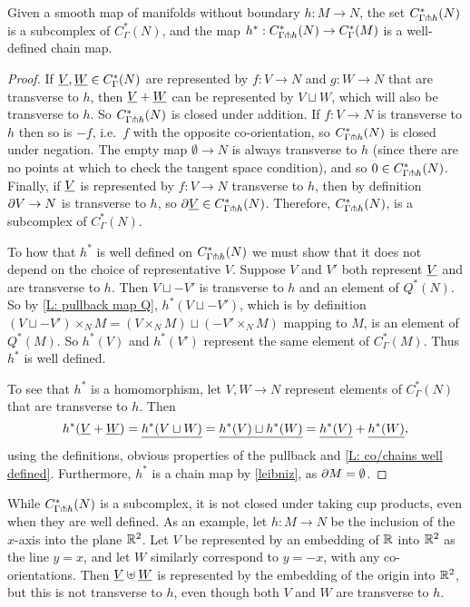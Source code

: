 \begin{proposition}
Given a smooth map of manifolds without boundary $h \colon M \to N$, the set $C^*_{\Gamma\pitchfork h}(N)$ is a subcomplex of $C^*_{\Gamma}(N)$, and the map $h^*:C^*_{\Gamma\pitchfork h}(N) \to C^*_{\Gamma}(M)$ is a well-defined chain map.
\end{proposition}
\begin{proof}
If $\underline{V},\underline{W} \in C^*_\Gamma(N)$ are represented by $f \colon V \to N$ and $g \colon W \to N$ that are transverse to $h$, then $\underline{V}+\underline{W}$ can be represented by $V\sqcup W$, which will also be transverse to $h$. So $C^*_{\Gamma\pitchfork h}(N)$ is closed under addition. If $f \colon V \to N$ is transverse to $h$ then so is $-f$, i.e.\ $f$ with the opposite co-orientation, so $C^*_{\Gamma\pitchfork h}(N)$ is closed under negation. The empty map $\emptyset \to N$ is always transverse to $h$ (since there are no points at which to check the tangent space condition), and so $0 \in C^*_{\Gamma\pitchfork h}(N)$. Finally, if $\underline{V}$ is represented by $f \colon V \to N$ transverse to $h$, then by definition $\partial V \to N$ is transverse to $h$, so $\partial \underline{V} \in C^*_{\Gamma\pitchfork h}(N)$. Therefore, $C^*_{\Gamma\pitchfork h}(N)$, is a subcomplex of $C^*_{\Gamma}(N)$.

To how that $h^*$ is well defined on $C^*_{\Gamma\pitchfork h}(N)$ we must show that it does not depend on the choice of representative $V$. Suppose $V$ and $V'$ both represent $\underline{V}$ and are transverse to $h$. Then $V\sqcup -V'$ is transverse to $h$ and an element of $Q^*(N)$. So by \cref{L: pullback map Q}, $h^*(V\sqcup -V')$, which is by definition $(V\sqcup -V')\times_NM = (V\times_NM)\sqcup (-V'\times_NM)$ mapping to $M$, is an element of $Q^*(M)$. So $h^*(V)$ and $h^*(V')$ represent the same element of $C^*_{\Gamma}(M)$. Thus $h^*$ is well defined.

To see that $h^*$ is a homomorphism, let $V,W \to N$ represent elements of $C^*_{\Gamma}(N)$ that are transverse to $h$. Then
$$h^*(\underline{V}+\underline{W}) = \underline{h^*(V\sqcup W)} = \underline{h^*(V)\sqcup h^*(W)} = \underline{h^*(V)}+\underline{h^*(W)},$$
using the definitions, obvious properties of the pullback and \cref{L: co/chains well defined}. Furthermore, $h^*$ is a chain map by \cref{leibniz}, as $\partial M = \emptyset$.
\end{proof}



\begin{remark}
While $C^*_{\Gamma\pitchfork h}(N)$ is a subcomplex, it is not closed under taking cup products, even when they are well defined. As an example, let $h \colon M \to N$ be the inclusion of the $x$-axis into the plane $\mathbb{R}^2$. Let $V$ be represented by an embedding of $\mathbb{R}$ into $\mathbb{R}^2$ as the line $y = x$, and let $W$ similarly correspond to $y = -x$, with any co-orientations. Then $\underline{V} \uplus \underline{W}$ is represented by the embedding of the origin into $\mathbb{R}^2$, but this is not transverse to $h$, even though both $V$ and $W$ are transverse to $h$.
\end{remark}


